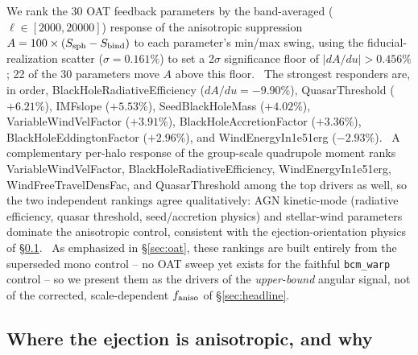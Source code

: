 \documentclass[11pt]{article}
\newcommand{\faniso}{f_{\rm aniso}}
\begin{document}
We rank the 30 OAT feedback parameters by the band-averaged
($\ell\in[2000,20000]$) response of the anisotropic suppression
$A=100\times(S_{\rm sph}-S_{\rm bind})$ to each parameter's min/max swing,
using the fiducial-realization scatter ($\sigma=0.161\%$) to set a
2$\sigma$ significance floor of $|dA/du|>0.456\%$; 22 of the 30 parameters
move $A$ above this floor.\ %
The strongest responders are, in order, BlackHoleRadiativeEfficiency
($dA/du=-9.90\%$), QuasarThreshold ($+6.21\%$), IMFslope ($+5.53\%$),
SeedBlackHoleMass ($+4.02\%$), VariableWindVelFactor ($+3.91\%$),
BlackHoleAccretionFactor ($+3.36\%$), BlackHoleEddingtonFactor
($+2.96\%$), and WindEnergyIn1e51erg ($-2.93\%$).\ %
A complementary per-halo response of the group-scale quadrupole moment
ranks VariableWindVelFactor, BlackHoleRadiativeEfficiency,
WindEnergyIn1e51erg, WindFreeTravelDensFac, and QuasarThreshold among the
top drivers as well, so the two independent rankings agree qualitatively:
AGN kinetic-mode (radiative efficiency, quasar threshold, seed/accretion
physics) and stellar-wind parameters dominate the anisotropic control,
consistent with the ejection-orientation physics of
\S\ref{sec:ejection}.\ %
As emphasized in \S\ref{sec:oat}, these rankings are built entirely from
the superseded mono control -- no OAT sweep yet exists for the faithful
\texttt{bcm\_warp} control -- so we present them as the drivers of the
\emph{upper-bound} angular signal, not of the corrected, scale-dependent
$\faniso$ of \S\ref{sec:headline}.\ %

\subsection{Where the ejection is anisotropic, and why}\label{sec:ejection}
\end{document}
